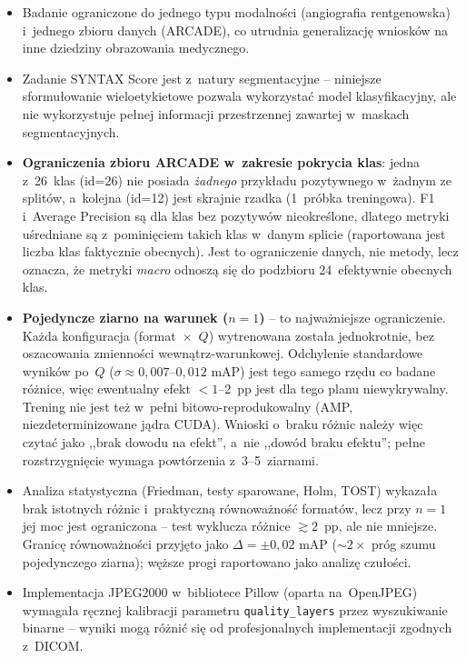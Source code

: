 \documentclass[12pt,a4paper]{article}
\begin{document}
\begin{itemize}
    \item Badanie ograniczone do jednego typu modalności (angiografia rentgenowska) i~jednego zbioru danych (ARCADE), co utrudnia generalizację wniosków na inne dziedziny obrazowania medycznego.
    \item Zadanie SYNTAX Score jest z~natury segmentacyjne -- niniejsze sformułowanie wieloetykietowe pozwala wykorzystać model klasyfikacyjny, ale nie wykorzystuje pełnej informacji przestrzennej zawartej w~maskach segmentacyjnych.
    \item \textbf{Ograniczenia zbioru ARCADE w~zakresie pokrycia klas}: jedna z~26~klas (id=26) nie posiada \emph{żadnego} przykładu pozytywnego w~żadnym ze splitów, a~kolejna (id=12) jest skrajnie rzadka (1~próbka treningowa). F1 i~Average Precision są dla klas bez pozytywów nieokreślone, dlatego metryki uśredniane są z~pominięciem takich klas w~danym splicie (raportowana jest liczba klas faktycznie obecnych). Jest to ograniczenie danych, nie metody, lecz oznacza, że metryki \emph{macro} odnoszą się do podzbioru 24~efektywnie obecnych klas.
    \item \textbf{Pojedyncze ziarno na warunek ($n=1$)} -- to najważniejsze ograniczenie. Każda konfiguracja (format~$\times$~$Q$) wytrenowana została jednokrotnie, bez oszacowania zmienności wewnątrz-warunkowej. Odchylenie standardowe wyników po~$Q$ ($\sigma \approx 0{,}007$--$0{,}012$ mAP) jest tego samego rzędu co badane różnice, więc ewentualny efekt $<\!1$--$2$~pp jest dla tego planu niewykrywalny. Trening nie jest też w~pełni bitowo-reprodukowalny (AMP, niezdeterminizowane jądra CUDA). Wnioski o~braku różnic należy więc czytać jako ,,brak dowodu na efekt'', a~nie ,,dowód braku efektu''; pełne rozstrzygnięcie wymaga powtórzenia z~3--5~ziarnami.
    \item Analiza statystyczna (Friedman, testy sparowane, Holm, TOST) wykazała brak istotnych różnic i~praktyczną równoważność formatów, lecz przy $n=1$ jej moc jest ograniczona -- test wyklucza różnice $\gtrsim 2$~pp, ale nie mniejsze. Granicę równoważności przyjęto jako $\Delta=\pm 0{,}02$ mAP (${\sim}2\times$ próg szumu pojedynczego ziarna); węższe progi raportowano jako analizę czułości.
    \item Implementacja JPEG2000 w~bibliotece Pillow (oparta na~OpenJPEG) wymagała ręcznej kalibracji parametru \texttt{quality\_layers} przez wyszukiwanie binarne -- wyniki mogą różnić się od profesjonalnych implementacji zgodnych z~DICOM.
\end{itemize}
\end{document}
